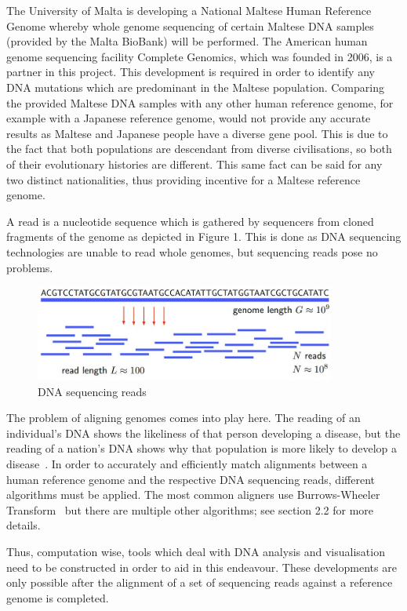 \documentclass{csfyp}
\begin{document}
The University of Malta is developing a National Maltese Human Reference Genome whereby whole genome sequencing of certain Maltese DNA samples (provided by the Malta BioBank) will be performed.  The American human genome sequencing facility Complete Genomics, which was founded in 2006, is a partner in this project.  This development is required in order to identify any DNA mutations which are predominant in the Maltese population.  Comparing the provided Maltese DNA samples with any other human reference genome, for example with a Japanese reference genome, would not provide any accurate results as Maltese and Japanese people have a diverse gene pool.  This is due to the fact that both populations are descendant from diverse civilisations, so both of their evolutionary histories are different.  This same fact can be said for any two distinct nationalities, thus providing incentive for a Maltese reference genome.  

A read is a nucleotide sequence which is gathered by sequencers from cloned fragments of the genome as depicted in Figure 1.  This is done as DNA sequencing technologies are unable to read whole genomes, but sequencing reads pose no problems.  

\begin{figure}[h!]
  \includegraphics[width=\linewidth, height=120]{dnareads.jpg}
  \caption{DNA sequencing reads}
  \label{fig:reads}
\end{figure}

The problem of aligning genomes comes into play here.  The reading of an individual's DNA shows the likeliness of that person developing a disease, but the reading of a nation’s DNA shows why that population is more likely to develop a disease~\cite{think}.  In order to accurately and efficiently match alignments between a human reference genome and the respective DNA sequencing reads, different algorithms must be applied.  The most common aligners use Burrows-Wheeler Transform~\cite{bwtransform, cgreads} but there are multiple other algorithms; see section 2.2 for more details.  

Thus, computation wise, tools which deal with DNA analysis and visualisation need to be constructed in order to aid in this endeavour.  These developments are only possible after the alignment of a set of sequencing reads against a reference genome is completed.  
\end{document}
